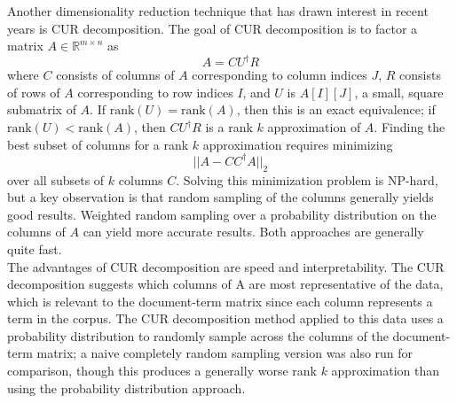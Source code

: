 \documentclass{article}
\begin{document}
Another dimensionality reduction technique that has drawn interest in recent years is CUR decomposition. The goal of CUR decomposition is to factor a matrix $A \in \mathbb{R}^{m \times n}$ as
$$A = CU^\dagger R$$
where $C$ consists of columns of $A$ corresponding to column indices $J$, $R$ consists of rows of $A$ corresponding to row indices $I$, and $U$ is $A[I][J]$, a small, square submatrix of $A$. If $\textrm{rank}(U) = \textrm{rank}(A)$, then this is an exact equivalence; if $\textrm{rank}(U) < \textrm{rank}(A)$, then $CU^\dagger R$ is a rank $k$ approximation of $A$. Finding the best subset of columns for a rank $k$ approximation requires minimizing
$$||A - CC^\dagger A||_2$$
over all subsets of $k$ columns $C$. Solving this minimization problem is NP-hard, but a key observation is that random sampling of the columns generally yields good results. Weighted random sampling over a probability distribution on the columns of $A$ can yield more accurate results. Both approaches are generally quite fast.\\

The advantages of CUR decomposition are speed and interpretability. The CUR decomposition suggests which columns of A are most representative of the data, which is relevant to the document-term matrix since each column represents a term in the corpus. The CUR decomposition method applied to this data uses a probability distribution to randomly sample across the columns of the document-term matrix; a naive completely random sampling version was also run for comparison, though this produces a generally worse rank $k$ approximation than using the probability distribution approach.
\end{document}
